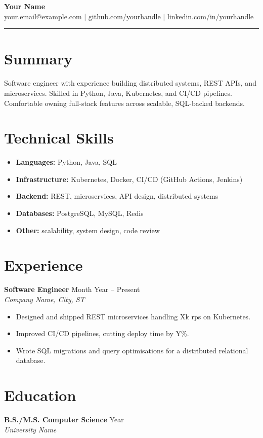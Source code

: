 \documentclass[11pt,letterpaper]{article}
\begin{document}
{\Large \textbf{Your Name}} \\
your.email@example.com \quad | \quad github.com/yourhandle \quad | \quad linkedin.com/in/yourhandle

\bigskip
\hrule
\bigskip

\section*{Summary}
Software engineer with experience building distributed systems, REST APIs, and microservices.
Skilled in Python, Java, Kubernetes, and CI/CD pipelines.
Comfortable owning full-stack features across scalable, SQL-backed backends.

\section*{Technical Skills}
\begin{itemize}[leftmargin=*]
  \item \textbf{Languages:} Python, Java, SQL
  \item \textbf{Infrastructure:} Kubernetes, Docker, CI/CD (GitHub Actions, Jenkins)
  \item \textbf{Backend:} REST, microservices, API design, distributed systems
  \item \textbf{Databases:} PostgreSQL, MySQL, Redis
  \item \textbf{Other:} scalability, system design, code review
\end{itemize}

\section*{Experience}

\textbf{Software Engineer} \hfill Month Year -- Present \\
\textit{Company Name, City, ST}
\begin{itemize}[leftmargin=*]
  \item Designed and shipped REST microservices handling Xk rps on Kubernetes.
  \item Improved CI/CD pipelines, cutting deploy time by Y\%.
  \item Wrote SQL migrations and query optimisations for a distributed relational database.
\end{itemize}

\section*{Education}
\textbf{B.S./M.S. Computer Science} \hfill Year \\
\textit{University Name}
\end{document}
